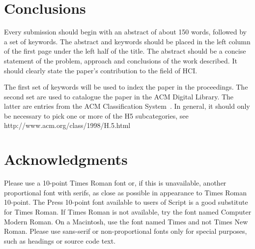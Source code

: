 \documentclass{chi2009}
\begin{document}
\section{Conclusions}

Every submission should begin with an abstract of about 150 words,
followed by a set of keywords. The abstract and keywords should be
placed in the left column of the first page under the left half of the
title. The abstract should be a concise statement of the problem,
approach and conclusions of the work described.  It should clearly
state the paper's contribution to the field of HCI.

The first set of keywords will be used to index the paper in the
proceedings. The second set are used to catalogue the paper in the ACM
Digital Library. The latter are entries from the ACM Classification
System~\cite{acm_categories}.  In general, it should only be necessary
to pick one or more of the H5 subcategories, see
http://www.acm.org/class/1998/H.5.html

\section{Acknowledgments}

Please use a 10-point Times Roman font or, if this is unavailable,
another proportional font with serifs, as close as possible in
appearance to Times Roman 10-point. The Press 10-point font available
to users of Script is a good substitute for Times Roman. If Times
Roman is not available, try the font named Computer Modern Roman. On a
Macintosh, use the font named Times and not Times New Roman. Please
use sans-serif or non-proportional fonts only for special purposes,
such as headings or source code text.



\end{document}
